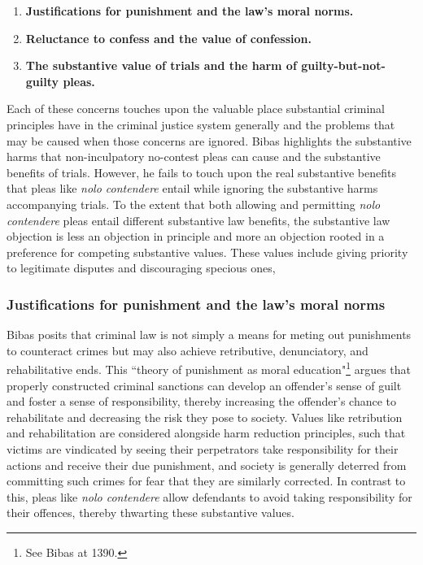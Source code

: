 \begin{enumerate}
    \item \textbf{Justifications for punishment and the law's moral norms.} 
    \item \textbf{Reluctance to confess and the value of confession.}
    \item \textbf{The substantive value of trials and the harm of guilty-but-not-guilty pleas.}
\end{enumerate}

Each of these concerns touches upon the valuable place substantial criminal principles have in the criminal justice system generally and the problems that may be caused when those concerns are ignored. Bibas highlights the substantive harms that non-inculpatory no-contest pleas can cause and the substantive benefits of trials. However, he fails to touch upon the real substantive benefits that pleas like \textit{nolo contendere} entail while ignoring the substantive harms accompanying trials. To the extent that both allowing and permitting \textit{nolo contendere} pleas entail different substantive law benefits, the substantive law objection is less an objection in principle and more an objection rooted in a preference for competing substantive values. These values include giving priority to legitimate disputes and discouraging specious ones, 

\subsubsection{Justifications for punishment and the law's moral norms}

Bibas posits that criminal law is not simply a means for meting out punishments to counteract crimes but may also achieve retributive, denunciatory, and rehabilitative ends. This ``theory of punishment as moral education"\footnote{See Bibas at 1390.} argues that properly constructed criminal sanctions can develop an offender's sense of guilt and foster a sense of responsibility, thereby increasing the offender's chance to rehabilitate and decreasing the risk they pose to society. Values like retribution and rehabilitation are considered alongside harm reduction principles, such that victims are vindicated by seeing their perpetrators take responsibility for their actions and receive their due punishment, and society is generally deterred from committing such crimes for fear that they are similarly corrected. In contrast to this, pleas like \textit{nolo contendere} allow defendants to avoid taking responsibility for their offences, thereby thwarting these substantive values.

